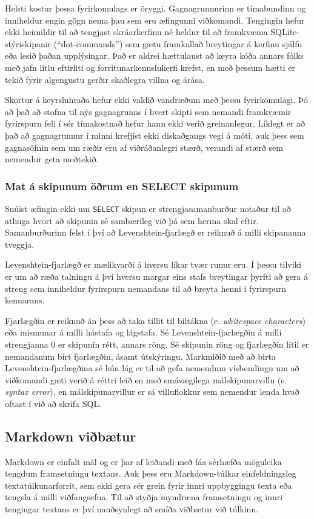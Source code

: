 \documentclass[a4paper,12pt,twoside,BCOR=10mm]{scrbook}
\begin{document}
Helsti kostur þessa fyrirkomulags er öryggi. Gagnagrunnurinn er tímabundinn og inniheldur engin gögn nema þau sem eru æfingunni viðkomandi. Tengingin hefur ekki heimildir til að tengjast skráarkerfinu né heldur til að framkvæma SQLite-stýriskipanir (``dot-commands'') sem gætu framkallað breytingar á kerfinu sjálfu eða lesið þaðan upplýsingar. Það er aldrei hættulaust að keyra kóða annars fólks með jafn litlu eftirliti og forritunarkennslukerfi krefst, en með þessum hætti er tekið fyrir algengustu gerðir skaðlegra villna og árása.

Skortur á keyrsluhraða hefur ekki valdið vandræðum með þessu fyrirkomulagi. Þó að það að stofna til nýs gagnagrunns í hvert skipti sem nemandi framkvæmir fyrirspurn feli í sér tímakostnað hefur hann ekki verið greinanlegur. Líklegt er að það að gagnagrunnur í minni krefjist ekki diskaðgangs vegi á móti, auk þess sem gagnasöfnin sem um ræðir eru af viðráðanlegri stærð, verandi af stærð sem nemendur geta meðtekið.
\subsubsection{Mat á skipunum öðrum en SELECT skipunum}
Snúist æfingin ekki um \texttt{SELECT} skipun er strengjasamanburður notaður til að athuga hvort að skipunin sé sambærileg við þá sem herma skal eftir. Samanburðurinn felst í því að Levenshtein-fjarlægð er reiknuð á milli skipananna tveggja. 

Levenshtein-fjarlægð er mælikvarði á hversu líkar tvær runur eru. Í þessu tilviki er um að ræða talningu á því hversu margar eins stafs breytingar þyrfti að gera á streng sem inniheldur fyrirspurn nemandans til að breyta henni í fyrirspurn kennarans.

Fjarlægðin er reiknuð án þess að taka tillit til biltákna (e. \emph{whitespace characters}) eða mismunar á milli hástafa og lágstafa. Sé Levenshtein-fjarlægðin á milli strengjanna 0 er skipunin rétt, annars röng. Sé skipunin röng og fjarlægðin lítil er nemandanum birt fjarlægðin, ásamt útskýringu. Markmiðið með að birta Levenshtein-fjarlægðina sé hún lág er til að gefa nemendum vísbendingu um að viðkomandi gæti verið á réttri leið en með smávægilega málskipunarvillu (e. \emph{syntax error}), en málskipunarvillur er sá villuflokkur sem nemendur lenda hvað oftast í við að skrifa SQL\cite{ahadi2016students}.

\subsection{Markdown viðbætur}
\label{sec:markdown-additions}
Markdown er einfalt mál og er þar af leiðandi með fáa sérhæfða möguleika tengdum framsetningu textans. Auk þess eru Markdown-túlkar einfeldningsleg textatúlkunarforrit, sem ekki gera sér grein fyrir innri uppbyggingu texta eða tengsla á milli viðfangsefna. Til að styðja myndræna framsetningu og innri tengingar textans er því nauðsynlegt að smíða viðbætur við túlkinn.
 
\end{document}
